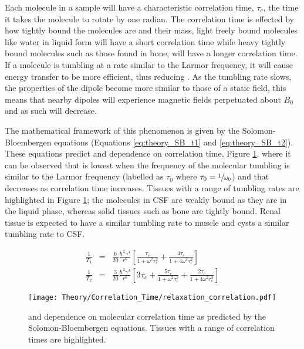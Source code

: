 Each molecule in a sample will have a characteristic correlation time, $\tau_c$, the time it takes the molecule to rotate by one radian. The correlation time is effected by how tightly bound the molecules are and their mass, light freely bound molecules like water in liquid form will have a short correlation time while heavy tightly bound molecules such as those found in bone, will have a longer correlation time. If a molecule is tumbling at a rate similar to the Larmor frequency, it will cause energy transfer to be more efficient, thus reducing \tone. As the tumbling rate slows, the properties of the dipole become more similar to those of a static field, this means that nearby dipoles will experience magnetic fields perpetuated about $B_0$ and as such \ttwo will decrease.

The mathematical framework of this phenomenon is given by the Solomon-Bloembergen equations \cite{solomon_relaxation_1955} (Equations \eqref{eq:theory_SB_t1} and \eqref{eq:theory_SB_t2}). These equations predict \tone and \ttwo dependence on correlation time, Figure \ref{fig:theory_relaxation_correlation}, where it can be observed that \tone is lowest when the frequency of the molecular tumbling is similar to the Larmor frequency (labelled as $\tau_0$ where $\tau_0=\sfrac{1}{\omega_0}$) and that \ttwo decreases as correlation time increases. Tissues with a range of tumbling rates are highlighted in Figure \ref{fig:theory_relaxation_correlation}; the molecules in \ac{CSF} are weakly bound as they are in the liquid phase, whereas solid tissues such as bone are tightly bound. Renal tissue is expected to have a similar tumbling rate to muscle and cysts a similar tumbling rate to \ac{CSF}.

\begin{eqnarray}
	\frac{1}{T_1}&=& \frac{6}{20}\frac{\hbar^2\gamma^4}{r^6}\left[ \frac{\tau_c}{1 + \omega^2\tau_c^2} + \frac{4\tau_c}{1 + 4\omega^2\tau_c^2}\right]
	\label{eq:theory_SB_t1}\\
	\frac{1}{T_2}&=& \frac{3}{20}\frac{\hbar^2\gamma^4}{r^6}\left[ 3\tau_c +  \frac{5\tau_c}{1 + \omega^2\tau_c^2} + \frac{2\tau_c}{1 + 4\omega^2\tau_c^2}\right]
	\label{eq:theory_SB_t2}
\end{eqnarray}
\begin{figure}[H]
	\centering
	\texttt{[image: Theory/Correlation\_Time/relaxation\_correlation.pdf]}
	\caption{\tone and \ttwo dependence on molecular correlation time as predicted by the Solomon-Bloembergen equations. Tissues with a range of correlation times are highlighted.}
	\label{fig:theory_relaxation_correlation}	
\end{figure}

